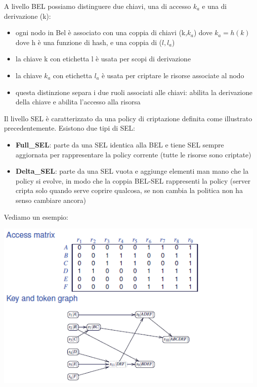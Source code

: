 A livello BEL possiamo distinguere due chiavi, una di accesso \(k_a\) e una di derivazione (k):
\begin{itemize}
    \item ogni nodo in Bel è associato con una coppia di chiavi (k,\(k_a\)) dove \(k_a = h(k)\) dove h è una funzione di hash, e una coppia di (\(l,l_a\))
    \item la chiave k con etichetta l è usata per scopi di derivazione
    \item la chiave \(k_a\) con etichetta \(l_a\) è usata per criptare le risorse associate al nodo
    \item questa distinzione separa i due ruoli associati alle chiavi: abilita la derivazione della chiave e abilita l'accesso alla risorsa
\end{itemize}
Il livello SEL è caratterizzato da una policy di criptazione definita come illustrato precedentemente. Esistono due tipi di SEL:
\begin{itemize}
    \item \textbf{Full\_SEL}: parte da una SEL identica alla BEL e tiene SEL sempre aggiornata per rappresentare la policy corrente (tutte le risorse sono criptate)
    \item \textbf{Delta\_SEL}: parte da una SEL vuota e aggiunge elementi man mano che la policy si evolve, in modo che la coppia BEL-SEL rappresenti la policy (server cripta solo quando serve coprire qualcosa, se non cambia la politica non ha senso cambiare ancora)
\end{itemize}
Vediamo un esempio:
\begin{center}
    \includegraphics[scale=0.7]{img/belsel1.png}
\end{center}
